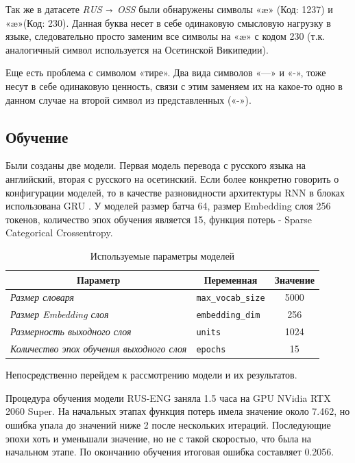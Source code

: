 \documentclass[a4paper,12pt]{article}
\begin{document}
    Так же в датасете \textit{RUS $\shortrightarrow$ OSS} были обнаружены символы «æ» (Код: 1237) и «æ»(Код: 230). Данная буква несет в себе одинаковую смысловую нагрузку в языке, следовательно просто заменим все символы на «æ» с кодом 230 (т.к. аналогичный символ используется на Осетинской Википедии). 
    
    Еще есть проблема с символом «тире». Два вида символов «—» и «-», тоже несут в себе одинаковую ценность, связи с этим заменяем их на какое-то одно в данном случае на второй символ из представленных («-»).
    
    \subsection*{Обучение}
    
    Были созданы две модели. Первая модель перевода с русского языка на английский, вторая с русского на осетинский. Если более конкретно говорить о конфигурации моделей, то в качестве разновидности архитектуры RNN в блоках использована GRU \cite{4}. У моделей размер батча 64, размер Embedding слоя 256 токенов, количество эпох обучения является 15, функция потерь - Sparse Categorical Crossentropy. 
    
    \begin{table}[h]
    \centering
    \begin{tabular}{|l|l|c|} 
    \hline
    \multicolumn{1}{|c|}{\textbf{Параметр}} & \multicolumn{1}{c|}{\textbf{Переменная}}                 & \multicolumn{1}{c|}{\textbf{Значение}}  \\ 
    \hline
    \textit{Размер словаря} & \texttt{max_vocab_size} & 5000 \\ 
    \hline
    \textit{Размер Embedding слоя} & \texttt{embedding_dim} & 256 \\
    \hline
    \textit{Размерность выходного слоя} & \texttt{units} & 1024 \\
    \hline
    \textit{Количество эпох обучения выходного слоя} & \texttt{epochs} & 15 \\
    \hline
    \end{tabular}
    \caption{Используемые параметры моделей}
    \end{table}
    
    Непосредственно перейдем к рассмотрению модели и их результатов.
    
    Процедура обучения модели RUS-ENG заняла 1.5 часа на GPU NVidia RTX 2060 Super. На начальных этапах функция потерь имела значение около 7.462, но ошибка упала до значений ниже 2 после нескольких итераций. Последующие эпохи хоть и уменьшали значение, но не с такой скоростью, что была на начальном этапе. По окончанию обучения итоговая ошибка составляет 0.2056.
	
\end{document}
